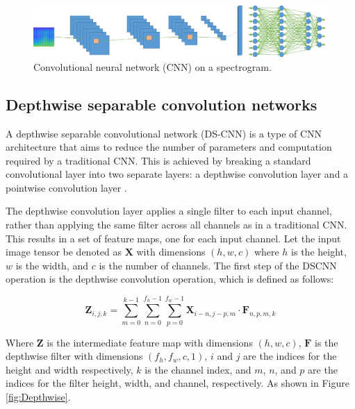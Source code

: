 \begin{figure}[htbp]
   \begin{center}
      \includegraphics[width=1\linewidth]{Chapitre1/figures/CNN.png}
   \end{center}
   \caption { Convolutional neural network (CNN) on a spectrogram.}
   \label{fig:CNN}
\end{figure}

\vspace{-2em} %

\subsection{Depthwise separable convolution networks }

 A depthwise separable convolutional network (DS-CNN) is a type of CNN architecture that aims to reduce the number of parameters and computation required by a traditional CNN. This is achieved by breaking a standard convolutional layer into two separate layers: a depthwise convolution layer and a pointwise convolution layer \cite{chollet2017xception}.

The depthwise convolution layer applies a single filter to each input channel, rather than applying the same filter across all channels as in a traditional CNN. This results in a set of feature maps, one for each input channel. Let the input image tensor be denoted as $\mathbf{X}$ with dimensions $(h, w, c)$ where $h$ is the height, $w$ is the width, and $c$ is the number of channels. The first step of the DSCNN operation is the depthwise convolution operation, which is defined as follows:


\begin{equation}
\mathbf{Z}_{i,j,k} = \sum_{m=0}^{k-1} \sum_{n=0}^{f_{h}-1} \sum_{p=0}^{f_{w}-1} \mathbf{X}_{i-n,j-p,m} \cdot \mathbf{F}_{n,p,m,k}
\end{equation}


Where $\mathbf{Z}$ is the intermediate feature map with dimensions $(h, w, c)$, $\mathbf{F}$ is the depthwise filter with dimensions $(f_h, f_w, c, 1)$, $i$ and $j$ are the indices for the height and width respectively, $k$ is the channel index, and $m$, $n$, and $p$ are the indices for the filter height, width, and channel, respectively. As shown in Figure \ref{fig:Depthwise}.

